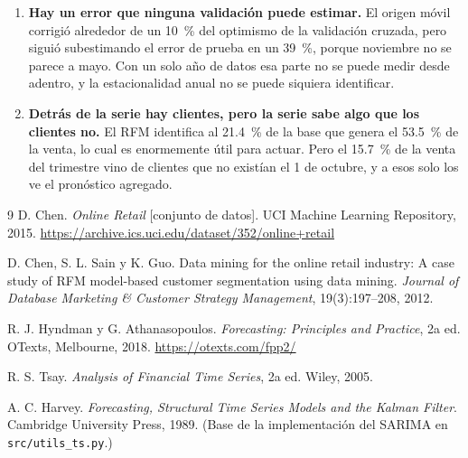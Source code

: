\documentclass[11pt]{article}
\begin{document}
\begin{enumerate}[leftmargin=1.6em]
  \item \textbf{Hay un error que ninguna validaci\'on puede estimar.} El
  origen m\'ovil corrigi\'o alrededor de un \SI{10}{\percent} del optimismo
  de la validaci\'on cruzada, pero sigui\'o subestimando el error de prueba en
  un \SI{39}{\percent}, porque noviembre no se parece a mayo. Con un solo
  a\~no de datos esa parte no se puede medir desde adentro, y la
  estacionalidad anual no se puede siquiera identificar.

  \item \textbf{Detr\'as de la serie hay clientes, pero la serie sabe algo
  que los clientes no.} El RFM identifica al \SI{21.4}{\percent} de la base
  que genera el \SI{53.5}{\percent} de la venta, lo cual es enormemente
  \'util para actuar. Pero el \SI{15.7}{\percent} de la venta del trimestre
  vino de clientes que no exist\'ian el 1 de octubre, y a esos solo los ve el
  pron\'ostico agregado.
\end{enumerate}

\begin{thebibliography}{9}
 D. Chen. \emph{Online Retail} [conjunto de datos]. UCI
Machine Learning Repository, 2015.
\url{https://archive.ics.uci.edu/dataset/352/online+retail}

 D. Chen, S. L. Sain y K. Guo. Data mining for the online
retail industry: A case study of RFM model-based customer segmentation using
data mining. \emph{Journal of Database Marketing \& Customer Strategy
Management}, 19(3):197--208, 2012.

 R. J. Hyndman y G. Athanasopoulos. \emph{Forecasting:
Principles and Practice}, 2a ed. OTexts, Melbourne, 2018.
\url{https://otexts.com/fpp2/}

 R. S. Tsay. \emph{Analysis of Financial Time Series}, 2a ed.
Wiley, 2005.

 A. C. Harvey. \emph{Forecasting, Structural Time Series
Models and the Kalman Filter}. Cambridge University Press, 1989. (Base de la
implementaci\'on del SARIMA en \texttt{src/utils\_ts.py}.)
\end{thebibliography}
\end{document}
